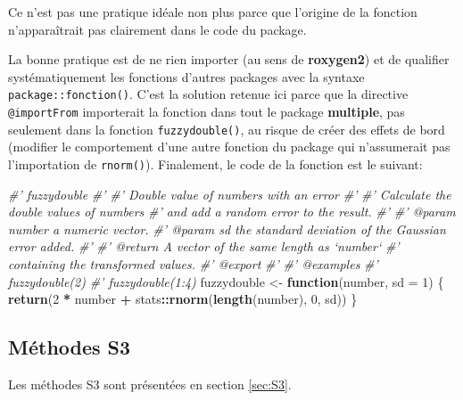 \documentclass[
  12pt,
  french,
  a4paper,
  extrafontsizes,onecolumn,openright
  ]{memoir}
\newenvironment{Shaded}{\begin{snugshade}}{\end{snugshade}}
\newcommand{\CommentTok}[1]{\textcolor[rgb]{0.56,0.35,0.01}{\textit{#1}}}
\newcommand{\ControlFlowTok}[1]{\textcolor[rgb]{0.13,0.29,0.53}{\textbf{#1}}}
\newcommand{\DataTypeTok}[1]{\textcolor[rgb]{0.13,0.29,0.53}{#1}}
\newcommand{\DecValTok}[1]{\textcolor[rgb]{0.00,0.00,0.81}{#1}}
\newcommand{\KeywordTok}[1]{\textcolor[rgb]{0.13,0.29,0.53}{\textbf{#1}}}
\newcommand{\NormalTok}[1]{#1}
\newcommand{\OperatorTok}[1]{\textcolor[rgb]{0.81,0.36,0.00}{\textbf{#1}}}
\newcommand{\StringTok}[1]{\textcolor[rgb]{0.31,0.60,0.02}{#1}}
\begin{document}
\normalsize

Ce n'est pas une pratique idéale non plus parce que l'origine de la fonction n'apparaîtrait pas clairement dans le code du package.

La bonne pratique est de ne rien importer (au sens de \textbf{roxygen2}) et de qualifier systématiquement les fonctions d'autres packages avec la syntaxe \texttt{package::fonction()}.
C'est la solution retenue ici parce que la directive \texttt{@importFrom} importerait la fonction dans tout le package \textbf{multiple}, pas seulement dans la fonction \texttt{fuzzydouble()}, au risque de créer des effets de bord (modifier le comportement d'une autre fonction du package qui n'assumerait pas l'importation de \texttt{rnorm()}).
Finalement, le code de la fonction est le suivant:

\scriptsize

\begin{Shaded}
\begin{Highlighting}[]
\CommentTok{#' fuzzydouble}
\CommentTok{#' }
\CommentTok{#' Double value of numbers with an error}
\CommentTok{#' }
\CommentTok{#' Calculate the double values of numbers }
\CommentTok{#' and add a random error to the result.}
\CommentTok{#'}
\CommentTok{#' @param number a numeric vector.}
\CommentTok{#' @param sd the standard deviation of the Gaussian error added.}
\CommentTok{#'}
\CommentTok{#' @return A vector of the same length as `number`}
\CommentTok{#'  containing the transformed values.}
\CommentTok{#' @export}
\CommentTok{#'}
\CommentTok{#' @examples}
\CommentTok{#' fuzzydouble(2)}
\CommentTok{#' fuzzydouble(1:4)}
\NormalTok{fuzzydouble <-}\StringTok{ }\ControlFlowTok{function}\NormalTok{(number, }\DataTypeTok{sd =} \DecValTok{1}\NormalTok{) \{}
    \KeywordTok{return}\NormalTok{(}\DecValTok{2} \OperatorTok{*}\StringTok{ }\NormalTok{number }\OperatorTok{+}\StringTok{ }\NormalTok{stats}\OperatorTok{::}\KeywordTok{rnorm}\NormalTok{(}\KeywordTok{length}\NormalTok{(number), }\DecValTok{0}\NormalTok{, sd))}
\NormalTok{\}}
\end{Highlighting}
\end{Shaded}

\normalsize

\hypertarget{muxe9thodes-s3}{%
\subsection{Méthodes S3}\label{muxe9thodes-s3}}

Les méthodes S3 sont présentées en section \ref{sec:S3}.
\end{document}
